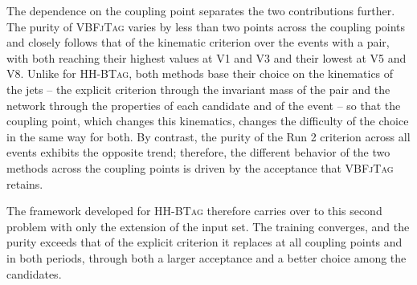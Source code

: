 The dependence on the coupling point separates the two contributions further. The purity of \textsc{VBFjTag} varies by less than two points across the coupling points and closely follows that of the kinematic criterion over the events with a pair, with both reaching their highest values at V1 and V3 and their lowest at V5 and V8. Unlike for \textsc{HH-BTag}, both methods base their choice on the kinematics of the jets -- the explicit criterion through the invariant mass of the pair and the network through the properties of each candidate and of the event -- so that the coupling point, which changes this kinematics, changes the difficulty of the choice in the same way for both. By contrast, the purity of the Run 2 criterion across all events exhibits the opposite trend; therefore, the different behavior of the two methods across the coupling points is driven by the acceptance that \textsc{VBFjTag} retains. 











The framework developed for \textsc{HH-BTag} therefore carries over to this second problem with only the extension of the input set. The training converges, and the purity exceeds that of the explicit criterion it replaces at all coupling points and in both periods, through both a larger acceptance and a better choice among the candidates.\bigskip


